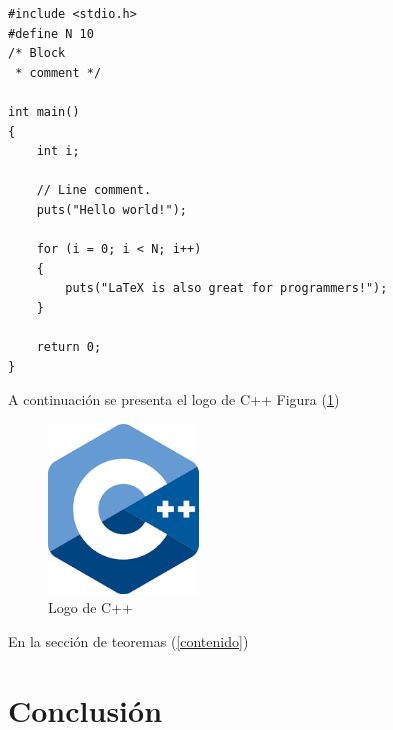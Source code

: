 \documentclass{article}
\begin{document}
\begin{lstlisting}
#include <stdio.h>
#define N 10
/* Block
 * comment */

int main()
{
    int i;

    // Line comment.
    puts("Hello world!");
    
    for (i = 0; i < N; i++)
    {
        puts("LaTeX is also great for programmers!");
    }

    return 0;
}
\end{lstlisting}

A continuación se presenta el logo de C++ Figura (\ref{fig:cpplogo})

\begin{figure}[h]
\includegraphics[width=4cm]{cpplogo.png}
\centering
\caption{Logo de C++}
\label{fig:cpplogo}
\end{figure}

En la sección de teoremas (\ref{contenido})

\section{Conclusión} \label{conclulsion}



\end{document}

